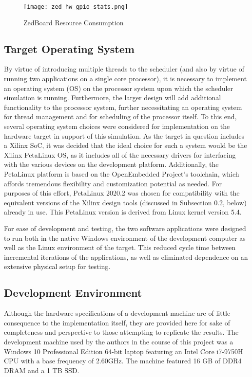 
\begin{figure}
    \centering
    \texttt{[image: zed\_hw\_gpio\_stats.png]}
    \caption[ZedBoard Resource Consumption]{ZedBoard Resource Consumption}
    \label{fig:zedResourceConsumption}
\end{figure}

\subsection{Target Operating System}\label{subsec:os}
By virtue of introducing multiple threads to the scheduler (and also by virtue of running two applications on a single core processor), it is necessary to implement an operating system (OS) on the processor system upon which the scheduler simulation is running. Furthermore, the larger design will add additional functionality to the processor system, further necessitating an operating system for thread management and for scheduling of the processor itself. To this end, several operating system choices were considered for implementation on the hardware target in support of this simulation. As the target in question includes a Xilinx SoC, it was decided that the ideal choice for such a system would be the Xilinx PetaLinux OS, as it includes all of the necessary drivers for interfacing with the various devices on the development platform. Additionally, the PetaLinux platform is based on the OpenEmbedded Project's toolchain, which affords tremendous flexibility and customization potential as needed. For purposes of this effort, PetaLinux 2020.2 was chosen for compatibility with the equivalent versions of the Xilinx design tools (discussed in Subsection \ref{subsec:devEnv}, below) already in use. This PetaLinux version is derived from Linux kernel version 5.4.

For ease of development and testing, the two software applications were designed to run both in the native Windows environment of the development computer as well as the Linux environment of the target. This reduced cycle time between incremental iterations of the applications, as well as eliminated dependence on an extensive physical setup for testing.

\subsection{Development Environment}\label{subsec:devEnv}
Although the hardware specifications of a development machine are of little consequence to the implementation itself, they are provided here for sake of completeness and perspective to those attempting to replicate the results. The development machine used by the authors in the course of this project was a Windows 10 Professional Edition 64-bit laptop featuring an Intel Core i7-9750H CPU with a base frequency of 2.60GHz. The machine featured 16 GB of DDR4 DRAM and a 1 TB SSD.

